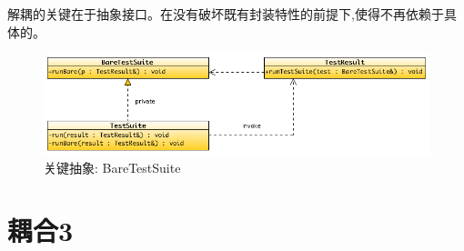 \begin{content}
解耦的关键在于抽象接口。在没有破坏既有封装特性的前提下,使得不再依赖于具体的。

\begin{figure}[H]
\centering
\includegraphics[width=1.0\textwidth]{figures/xunit/bare-test-suite-uml.png}
\caption{关键抽象: BareTestSuite}
 \label{fig:bare-test-suite-uml}
\end{figure}

\end{content}

\section{耦合3}

